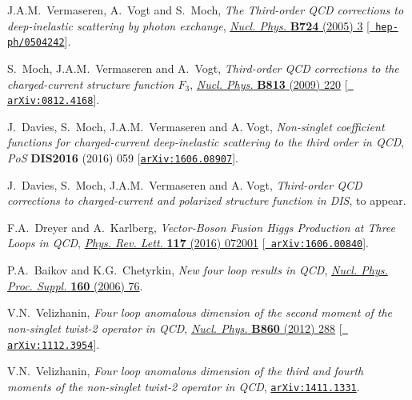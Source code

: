 \documentclass[12pt]{article}
\begin{document}
{\begin{thebibliography}{100}
J.A.M.~Vermaseren, A.~Vogt and S.~Moch, \emph{{The Third-order QCD corrections
  to deep-inelastic scattering by photon exchange}},
  \href{https://dx.doi.org/10.1016/j.nuclphysb.2005.06.020}{\emph{Nucl. Phys.}
  {\bf B724} (2005) 3} [\href{https://arxiv.org/abs/hep-ph/0504242}{{\tt
  hep-ph/0504242}}].

S.~Moch, J.A.M.~Vermaseren and A.~Vogt, \emph{{Third-order QCD corrections to
  the charged-current structure function $F_3$}},
  \href{https://dx.doi.org/10.1016/j.nuclphysb.2009.01.001}{\emph{Nucl. Phys.}
  {\bf B813} (2009) 220} [\href{https://arxiv.org/abs/0812.4168}{{\tt
  arXiv:0812.4168}}].

J.~Davies, S.~Moch, J.A.M.~Vermaseren and A. Vogt, \emph{{Non-singlet
  coefficient functions for charged-current deep-inelastic scattering to the
  third order in QCD}}, {\emph{PoS} {\bf DIS2016} (2016) 059}
  [\href{https://arxiv.org/abs/1606.08907}{{\tt arXiv:1606.08907}}].

J.~Davies, S.~Moch, J.A.M.~Vermaseren and A. Vogt,
  {\it Third-order QCD corrections to charged-current and polarized structure 
  function in DIS}, to appear.

F.A.~Dreyer and A.~Karlberg, \emph{{Vector-Boson Fusion Higgs Production at
  Three Loops in QCD}},
  \href{https://dx.doi.org/10.1103/PhysRevLett.117.072001}{\emph{Phys. Rev.
  Lett.} {\bf 117} (2016) 072001} [\href{https://arxiv.org/abs/1606.00840}{{\tt
  arXiv:1606.00840}}].

P.A.~Baikov and K.G.~Chetyrkin, \emph{{New four loop results in QCD}},
  \href{https://dx.doi.org/10.1016/j.nuclphysbps.2006.09.031}{\emph{Nucl. Phys.
  Proc. Suppl.} {\bf 160} (2006) 76}.

V.N.~Velizhanin, \emph{{Four loop anomalous dimension of the second moment of
  the non-singlet twist-2 operator in QCD}},
  \href{https://dx.doi.org/10.1016/j.nuclphysb.2012.03.006}{\emph{Nucl. Phys.}
  {\bf B860} (2012) 288} [\href{https://arxiv.org/abs/1112.3954}{{\tt
  arXiv:1112.3954}}].

V.N.~Velizhanin, \emph{{Four loop anomalous dimension of the third and fourth
  moments of the non-singlet twist-2 operator in QCD}},
  \href{https://arxiv.org/abs/1411.1331}{{\tt arXiv:1411.1331}}.


\end{thebibliography}}
\end{document}
